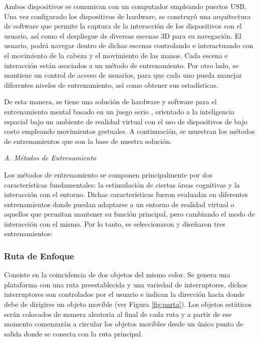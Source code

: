 \documentclass[conference]{IEEEtran}
\begin{document}
Ambos dispositivos se comunican con un computador empleando puertos USB. Una vez configurado los dispositivos de hardware, se construyó una arquitectura de software que permite la captura de la interacción de los dispositivos con el usuario, así como el despliegue de diversas escenas 3D para su navegación. El usuario, podrá navegar dentro de dichas escenas controlando e interactuando con el movimiento de la cabeza y el movimiento de las manos. Cada escena e interacción están asociados a un método de entrenamiento. Por otro lado, se mantiene un control de acceso de usuarios, para que cada uno pueda manejar diferentes niveles de entrenamiento, así como obtener sus estadísticas.

De esta manera, se tiene una solución de hardware y software para el entrenamiento mental basado en un juego serio \cite{Michael:2005:SGG:1051239}, orientado a la inteligencia espacial bajo un ambiente de realidad virtual con el uso de dispositivos de bajo costo empleando movimientos gestuales. A continuación, se muestran los métodos de entrenamientos que son la base de nuestra solución. 
\bigskip

\textit{A. M\'etodos de Entrenamiento}
\medskip

Los métodos de entrenamiento se componen principalmente por dos características fundamentales: la estimulación de ciertas áreas cognitivas y la interacción con el entorno. Dichas características fueron evaluadas en diferentes entrenamientos donde puedan adaptarse a un entorno de realidad virtual o aquellos que permitan mantener su función principal, pero cambiando el modo de interacción con el mismo. Por lo tanto, se seleccionaron y diseñaron tres entrenamientos:

\subsubsection*{\textbf{Ruta de Enfoque}}

Consiste en la coincidencia de dos objetos del mismo color. Se genera una plataforma con una ruta preestablecida y una variedad de interruptores, dichos interruptores son controlados por el usuario e indican la dirección hacia donde debe de dirigirse un objeto movible (ver Figura \ref{fig:parta}). Los objetos estáticos serán colocados de manera aleatoria al final de cada ruta y a partir de ese momento comenzarán a circular los objetos movibles desde un único punto de salida donde se conecta con la ruta principal.
\end{document}
